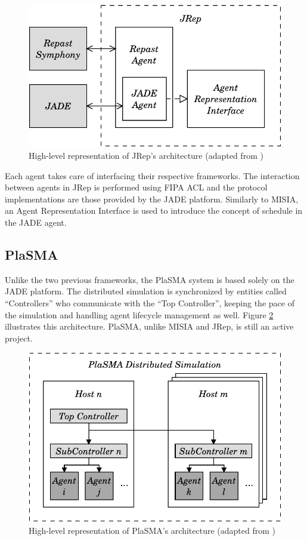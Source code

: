 \documentclass[a4paper,twoside]{article}
\begin{document}
\begin{figure}
	\centering
	\includegraphics[width=\linewidth]{../figures/jrep.pdf}
	\caption[JRep's architecture]{High-level representation of JRep's architecture (adapted from \cite{gormer2011jrep})}
	\label{fig:jrep}
\end{figure}

Each agent takes care of interfacing their respective frameworks. The interaction between agents in JRep is performed using FIPA ACL and the protocol implementations are those provided by the JADE platform. Similarly to MISIA, an Agent Representation Interface is used to introduce the concept of schedule in the JADE agent.

\subsection{PlaSMA}
Unlike the two previous frameworks, the PlaSMA system is based solely on the JADE platform. The distributed simulation is synchronized by entities called ``Controllers'' who communicate with the ``Top Controller'', keeping the pace of the simulation and handling agent lifecycle management as well. Figure \ref{fig:plasma} illustrates this architecture. PlaSMA, unlike MISIA and JRep, is still an active project.

\begin{figure}
	\centering
	\includegraphics[width=\linewidth]{../figures/PlaSMA.pdf}
	\caption[PlaSMA's architecture]{High-level representation of PlaSMA's architecture (adapted from \cite{warden2010towards})}
	\label{fig:plasma}
\end{figure}
\end{document}
